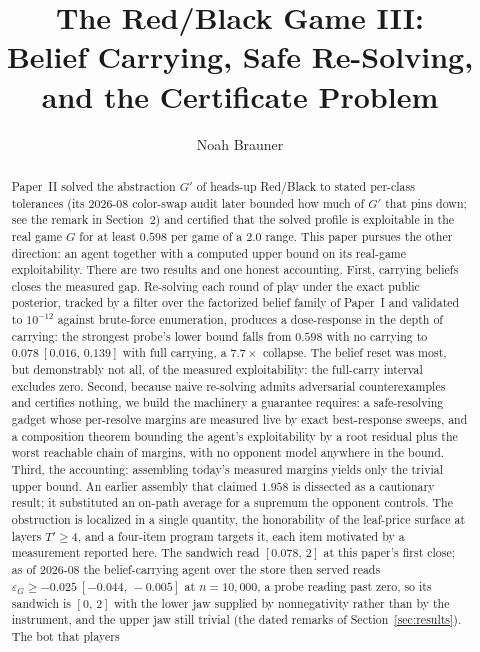 \documentclass[11pt]{article}
\title{\bfseries The Red/Black Game III:\\[2pt]
       \large Belief Carrying, Safe Re-Solving,\\
       and the Certificate Problem}
\author{Noah Brauner}
\date{}
\theoremstyle{plain}
\theoremstyle{definition}
\theoremstyle{remark}
\newcommand{\game}{\ensuremath{G}}
\newcommand{\gp}{\ensuremath{G'}}
\newcommand{\epsG}{\ensuremath{\varepsilon_{\game}}}
\begin{document}
\maketitle
\vspace{-2.5em}

\begin{abstract}
\noindent
Paper~II solved the abstraction $\gp$ of heads-up Red/Black to stated
per-class tolerances (its 2026-08 color-swap audit later bounded how
much of $\gp$ that pins down; see the remark in Section~2) and
certified that the solved profile is exploitable in the real game
$\game$ for at least $0.598$ per game of a $2.0$ range. This paper
pursues the other direction: an agent together with a computed upper
bound on its real-game exploitability. There are two results and one
honest accounting. First, carrying beliefs closes the measured gap.
Re-solving each round of play under the exact public posterior,
tracked by a filter over the factorized belief family of Paper~I and
validated to $10^{-12}$ against brute-force enumeration, produces a
dose-response in the depth of carrying: the strongest probe's lower
bound falls from $0.598$ with no carrying to $0.078\ [0.016,\,0.139]$
with full carrying, a $7.7\times$ collapse. The belief reset was most,
but demonstrably not all, of the measured exploitability: the
full-carry interval excludes zero. Second, because naive re-solving admits adversarial
counterexamples and certifies nothing, we build the machinery a
guarantee requires: a safe-resolving gadget whose per-resolve margins
are measured live by exact best-response sweeps, and a composition
theorem bounding the agent's exploitability by a root residual plus
the worst reachable chain of margins, with no opponent model anywhere
in the bound. Third, the accounting: assembling today's measured
margins yields only the trivial upper bound. An earlier assembly that
claimed $1.958$ is dissected as a cautionary result; it substituted an
on-path average for a supremum the opponent controls. The obstruction
is localized in a single quantity, the honorability of the leaf-price
surface at layers $T'\ge4$, and a four-item program targets it, each
item motivated by a measurement reported here. The sandwich read
$[0.078,\,2]$ at this paper's first close; as of 2026-08 the
belief-carrying agent over the store then served reads
$\epsG \ge -0.025\ [-0.044,\,-0.005]$ at $n=10{,}000$, a probe reading
past zero, so its sandwich is $[0,\,2]$ with the lower jaw supplied by
nonnegativity rather than by the instrument, and the upper jaw still
trivial
(the dated remarks of Section~\ref{sec:results}). The bot that players

\end{abstract}
\end{document}
